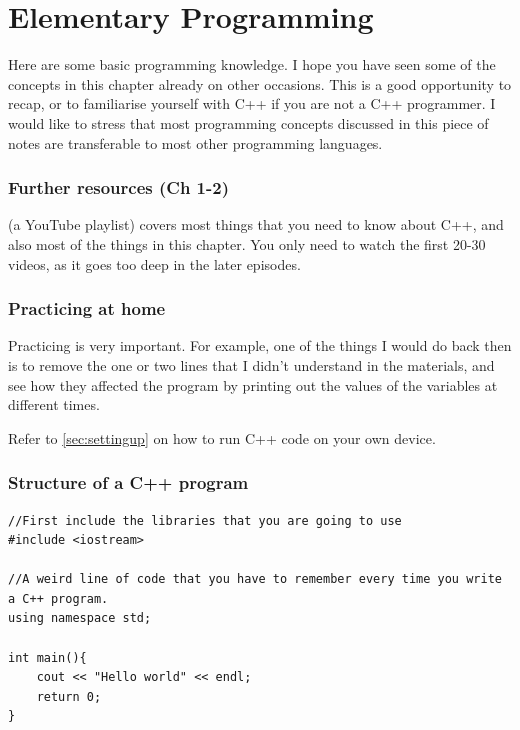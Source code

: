 \chapter{Elementary Programming}
\label{sec:elementary}

Here are some basic programming knowledge. I hope you have seen some of the concepts in this chapter already on other occasions. This is a good opportunity to recap, or to familiarise yourself with C++ if you are not a C++ programmer. I would like to stress that most programming concepts discussed in this piece of notes are transferable to most other programming languages.


\subsection*{Further resources (Ch 1-2)}
 (a YouTube playlist) covers most things that you need to know about C++, and also most of the things in this chapter. You only need to watch the first 20-30 videos, as it goes too deep in the later episodes.

\subsection*{Practicing at home}
Practicing is very important. For example, one of the things I would do back then is to remove the one or two lines that I didn't understand in the materials, and see how they affected the program by printing out the values of the variables at different times. 

Refer to \cref{sec:settingup} on how to run C++ code on your own device.

\subsection*{Structure of a C++ program}
\begin{lstlisting}
//First include the libraries that you are going to use
#include <iostream> 

//A weird line of code that you have to remember every time you write a C++ program.
using namespace std;

int main(){
    cout << "Hello world" << endl;
    return 0;
}
\end{lstlisting}

